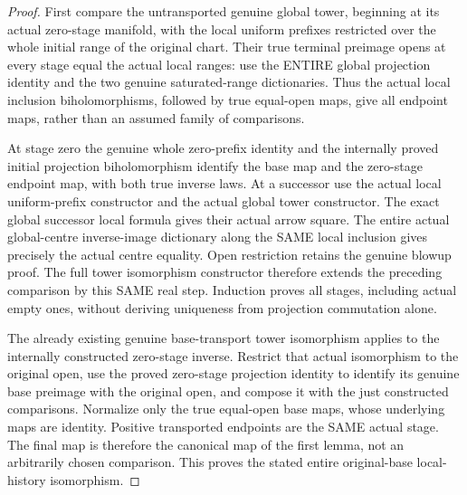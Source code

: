 \begin{proof}
First compare the untransported genuine global tower, beginning at its
actual zero-stage manifold, with the local uniform prefixes restricted
over the whole initial range of the original chart. Their true terminal
preimage opens at every stage equal the actual local ranges: use the
ENTIRE global projection identity and the two genuine saturated-range
dictionaries. Thus the actual local inclusion biholomorphisms, followed
by true equal-open maps, give all endpoint maps, rather than an assumed
family of comparisons.

At stage zero the genuine whole zero-prefix identity and the internally
proved initial projection biholomorphism identify the base map and the
zero-stage endpoint map, with both true inverse laws. At a successor use
the actual local uniform-prefix constructor and the actual global tower
constructor. The exact global successor local formula gives their actual
arrow square. The entire actual global-centre inverse-image dictionary
along the SAME local inclusion gives precisely the actual centre equality.
Open restriction retains the genuine blowup proof. The full tower
isomorphism constructor therefore extends the preceding comparison by
this SAME real step. Induction proves all stages, including actual empty
ones, without deriving uniqueness from projection commutation alone.

The already existing genuine base-transport tower isomorphism applies to
the internally constructed zero-stage inverse. Restrict that actual
isomorphism to the original open, use the proved zero-stage projection
identity to identify its genuine base preimage with the original open,
and compose it with the just constructed comparisons. Normalize only the
true equal-open base maps, whose underlying maps are identity. Positive
transported endpoints are the SAME actual stage. The final map is therefore
the canonical map of the first lemma, not an arbitrarily chosen comparison.
This proves the stated entire original-base local-history isomorphism.
\end{proof}

